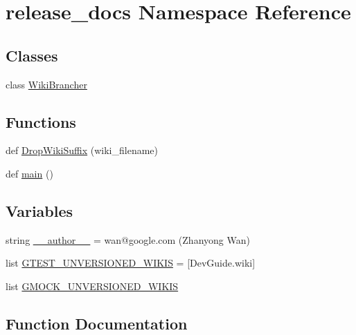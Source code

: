 \hypertarget{namespacerelease__docs}{}\section{release\+\_\+docs Namespace Reference}
\label{namespacerelease__docs}
\subsection*{Classes}
\begin{DoxyCompactItemize}
\item 
class \mbox{\hyperlink{classrelease__docs_1_1_wiki_brancher}{Wiki\+Brancher}}
\end{DoxyCompactItemize}
\subsection*{Functions}
\begin{DoxyCompactItemize}
\item 
def \mbox{\hyperlink{namespacerelease__docs_a6ea19a5ee397ce9f0565b90943d50e7f}{Drop\+Wiki\+Suffix}} (wiki\+\_\+filename)
\item 
def \mbox{\hyperlink{namespacerelease__docs_ac4eb92814ebe701e3936d1bfdd2ecf73}{main}} ()
\end{DoxyCompactItemize}
\subsection*{Variables}
\begin{DoxyCompactItemize}
\item 
string \mbox{\hyperlink{namespacerelease__docs_a552c656ae88e89e818b44f18fa40967b}{\+\_\+\+\_\+author\+\_\+\+\_\+}} = \textquotesingle{}wan@google.\+com (Zhanyong Wan)\textquotesingle{}
\item 
list \mbox{\hyperlink{namespacerelease__docs_aaeabb8c74d9db7a4b2f3c66e8f1a04ee}{G\+T\+E\+S\+T\+\_\+\+U\+N\+V\+E\+R\+S\+I\+O\+N\+E\+D\+\_\+\+W\+I\+K\+IS}} = \mbox{[}\textquotesingle{}Dev\+Guide.\+wiki\textquotesingle{}\mbox{]}
\item 
list \mbox{\hyperlink{namespacerelease__docs_a675f92ba4643a6aef7773a6178e49b29}{G\+M\+O\+C\+K\+\_\+\+U\+N\+V\+E\+R\+S\+I\+O\+N\+E\+D\+\_\+\+W\+I\+K\+IS}}
\end{DoxyCompactItemize}


\subsection{Function Documentation}
\mbox{\label{namespacerelease__docs_a6ea19a5ee397ce9f0565b90943d50e7f}} 
